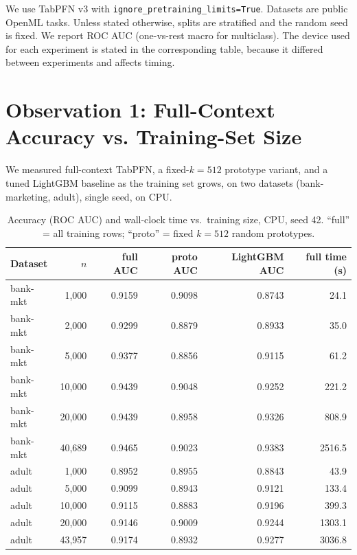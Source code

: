 \documentclass[11pt,a4paper]{article}
\begin{document}
We use TabPFN v3 with \texttt{ignore\_pretraining\_limits=True}. Datasets are
public OpenML tasks. Unless stated otherwise, splits are stratified and the
random seed is fixed. We report ROC AUC (one-vs-rest macro for multiclass).
The device used for each experiment is stated in the corresponding table,
because it differed between experiments and affects timing.

\section{Observation 1: Full-Context Accuracy vs. Training-Set Size}

We measured full-context TabPFN, a fixed-$k{=}512$ prototype variant, and a
tuned LightGBM \cite{ke2017lightgbm} baseline as the training set grows, on two
datasets
(bank-marketing, adult), single seed, on CPU.

\begin{table}[h]
\centering
\caption{Accuracy (ROC AUC) and wall-clock time vs.\ training size, CPU,
seed 42. ``full'' = all training rows; ``proto'' = fixed $k{=}512$ random
prototypes.}
\label{tab:scaling}
\begin{tabular}{lrrrrr}
\toprule
Dataset & $n$ & full AUC & proto AUC & LightGBM AUC & full time (s) \\
\midrule
bank-mkt & 1{,}000  & 0.9159 & 0.9098 & 0.8743 & 24.1 \\
bank-mkt & 2{,}000  & 0.9299 & 0.8879 & 0.8933 & 35.0 \\
bank-mkt & 5{,}000  & 0.9377 & 0.8856 & 0.9115 & 61.2 \\
bank-mkt & 10{,}000 & 0.9439 & 0.9048 & 0.9252 & 221.2 \\
bank-mkt & 20{,}000 & 0.9439 & 0.8958 & 0.9326 & 808.9 \\
bank-mkt & 40{,}689 & 0.9465 & 0.9023 & 0.9383 & 2516.5 \\
\midrule
adult & 1{,}000  & 0.8952 & 0.8955 & 0.8843 & 43.9 \\
adult & 5{,}000  & 0.9099 & 0.8943 & 0.9121 & 133.4 \\
adult & 10{,}000 & 0.9115 & 0.8883 & 0.9196 & 399.3 \\
adult & 20{,}000 & 0.9146 & 0.9009 & 0.9244 & 1303.1 \\
adult & 43{,}957 & 0.9174 & 0.8932 & 0.9277 & 3036.8 \\
\bottomrule
\end{tabular}
\end{table}
\end{document}
